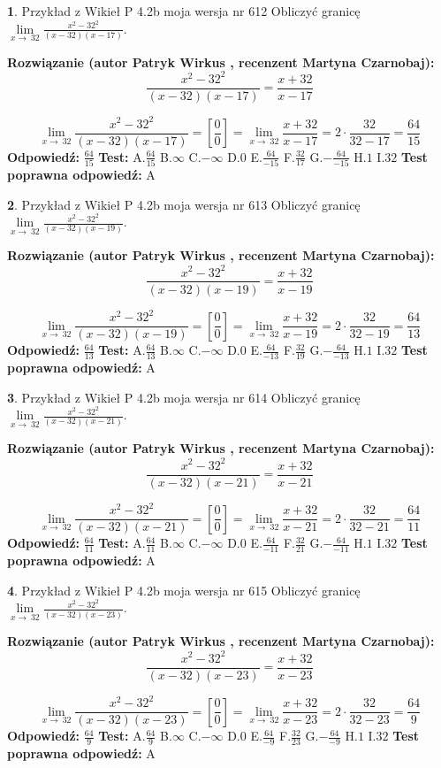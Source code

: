 \documentclass[12pt, a4paper]{article}
\theoremstyle{definition} %
\newtheorem{zad}{}
\newcommand{\zadStart}[1]{\begin{zad}#1\newline}
\newcommand{\zadStop}{\end{zad}}
\newcommand{\rozwStart}[2]{\noindent \textbf{Rozwiązanie (autor #1 , recenzent #2): }\newline}
\newcommand{\rozwStop}{\newline}
\newcommand{\odpStart}{\noindent \textbf{Odpowiedź:}\newline}
\newcommand{\odpStop}{\newline}
\newcommand{\testStart}{\noindent \textbf{Test:}\newline}
\newcommand{\testStop}{\newline}
\newcommand{\kluczStart}{\noindent \textbf{Test poprawna odpowiedź:}\newline}
\newcommand{\kluczStop}{\newline}
\begin{document}
\zadStart{Przykład z Wikieł P 4.2b moja wersja nr 612}
Obliczyć granicę $\lim\limits_{x\to\ 32}\frac{x^{2}-32^{2}}{(x-32)(x-17)}$.
\zadStop
\rozwStart{Patryk Wirkus}{Martyna Czarnobaj}
$$\frac{x^{2}-32^{2}}{(x-32)(x-17)}=\frac{x+32}{x-17}$$

$$\lim\limits_{x\to\ 32}\frac{x^{2}-32^{2}}{(x-32)(x-17)}=[\frac{0}{0}]=\lim\limits_{x\to\ 32}\frac{x+32}{x-17}=2 \cdot \frac{32}{32-17} = \frac{64}{15}$$
\rozwStop
\odpStart
$\frac{64}{15}$
\odpStop
\testStart
A.$\frac{64}{15}$
B.$\infty$
C.$-\infty$
D.$0$
E.$\frac{64}{-15}$
F.$\frac{32}{17}$
G.$-\frac{64}{-15}$
H.$1$
I.$32$
\testStop
\kluczStart
A
\kluczStop



\zadStart{Przykład z Wikieł P 4.2b moja wersja nr 613}
Obliczyć granicę $\lim\limits_{x\to\ 32}\frac{x^{2}-32^{2}}{(x-32)(x-19)}$.
\zadStop
\rozwStart{Patryk Wirkus}{Martyna Czarnobaj}
$$\frac{x^{2}-32^{2}}{(x-32)(x-19)}=\frac{x+32}{x-19}$$

$$\lim\limits_{x\to\ 32}\frac{x^{2}-32^{2}}{(x-32)(x-19)}=[\frac{0}{0}]=\lim\limits_{x\to\ 32}\frac{x+32}{x-19}=2 \cdot \frac{32}{32-19} = \frac{64}{13}$$
\rozwStop
\odpStart
$\frac{64}{13}$
\odpStop
\testStart
A.$\frac{64}{13}$
B.$\infty$
C.$-\infty$
D.$0$
E.$\frac{64}{-13}$
F.$\frac{32}{19}$
G.$-\frac{64}{-13}$
H.$1$
I.$32$
\testStop
\kluczStart
A
\kluczStop



\zadStart{Przykład z Wikieł P 4.2b moja wersja nr 614}
Obliczyć granicę $\lim\limits_{x\to\ 32}\frac{x^{2}-32^{2}}{(x-32)(x-21)}$.
\zadStop
\rozwStart{Patryk Wirkus}{Martyna Czarnobaj}
$$\frac{x^{2}-32^{2}}{(x-32)(x-21)}=\frac{x+32}{x-21}$$

$$\lim\limits_{x\to\ 32}\frac{x^{2}-32^{2}}{(x-32)(x-21)}=[\frac{0}{0}]=\lim\limits_{x\to\ 32}\frac{x+32}{x-21}=2 \cdot \frac{32}{32-21} = \frac{64}{11}$$
\rozwStop
\odpStart
$\frac{64}{11}$
\odpStop
\testStart
A.$\frac{64}{11}$
B.$\infty$
C.$-\infty$
D.$0$
E.$\frac{64}{-11}$
F.$\frac{32}{21}$
G.$-\frac{64}{-11}$
H.$1$
I.$32$
\testStop
\kluczStart
A
\kluczStop



\zadStart{Przykład z Wikieł P 4.2b moja wersja nr 615}
Obliczyć granicę $\lim\limits_{x\to\ 32}\frac{x^{2}-32^{2}}{(x-32)(x-23)}$.
\zadStop
\rozwStart{Patryk Wirkus}{Martyna Czarnobaj}
$$\frac{x^{2}-32^{2}}{(x-32)(x-23)}=\frac{x+32}{x-23}$$

$$\lim\limits_{x\to\ 32}\frac{x^{2}-32^{2}}{(x-32)(x-23)}=[\frac{0}{0}]=\lim\limits_{x\to\ 32}\frac{x+32}{x-23}=2 \cdot \frac{32}{32-23} = \frac{64}{9}$$
\rozwStop
\odpStart
$\frac{64}{9}$
\odpStop
\testStart
A.$\frac{64}{9}$
B.$\infty$
C.$-\infty$
D.$0$
E.$\frac{64}{-9}$
F.$\frac{32}{23}$
G.$-\frac{64}{-9}$
H.$1$
I.$32$
\testStop
\kluczStart
A
\kluczStop
\end{document}
